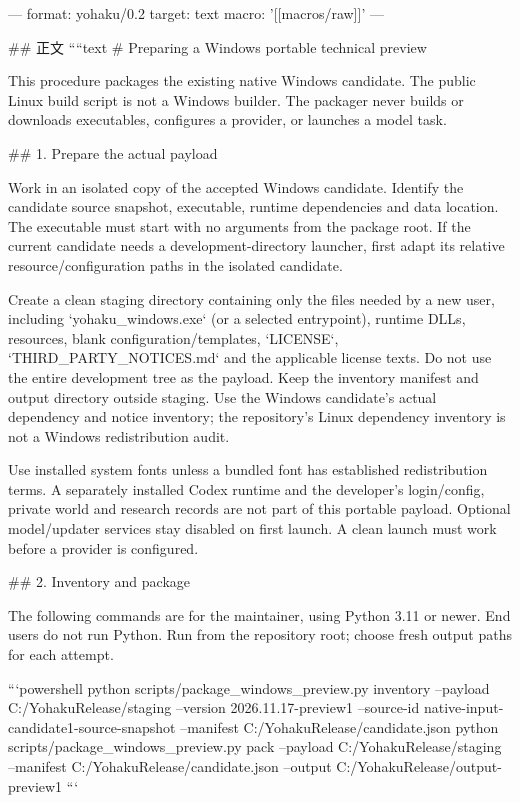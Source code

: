 ---
format: yohaku/0.2
target: text
macro: '[[macros/raw]]'
---

## 正文
````text
# Preparing a Windows portable technical preview

This procedure packages the existing native Windows candidate. The public
Linux build script is not a Windows builder. The packager never builds or
downloads executables, configures a provider, or launches a model task.

## 1. Prepare the actual payload

Work in an isolated copy of the accepted Windows candidate. Identify the
candidate source snapshot, executable, runtime dependencies and data location.
The executable must start with no arguments from the package root. If the
current candidate needs a development-directory launcher, first adapt its
relative resource/configuration paths in the isolated candidate.

Create a clean staging directory containing only the files needed by a new
user, including `yohaku_windows.exe` (or a selected entrypoint), runtime DLLs,
resources, blank configuration/templates, `LICENSE`, `THIRD_PARTY_NOTICES.md`
and the applicable license texts. Do not use the entire development tree as
the payload. Keep the inventory manifest and output directory outside staging.
Use the Windows candidate's actual dependency and notice inventory; the
repository's Linux dependency inventory is not a Windows redistribution audit.

Use installed system fonts unless a bundled font has established redistribution
terms. A separately installed Codex runtime and the developer's login/config,
private world and research records are not part of this portable payload.
Optional model/updater services stay disabled on first launch. A clean launch
must work before a provider is configured.

## 2. Inventory and package

The following commands are for the maintainer, using Python 3.11 or newer.
End users do not run Python. Run from the repository root; choose fresh output
paths for each attempt.

```powershell
python scripts/package_windows_preview.py inventory --payload C:/YohakuRelease/staging --version 2026.11.17-preview1 --source-id native-input-candidate1-source-snapshot --manifest C:/YohakuRelease/candidate.json
python scripts/package_windows_preview.py pack --payload C:/YohakuRelease/staging --manifest C:/YohakuRelease/candidate.json --output C:/YohakuRelease/output-preview1
```

